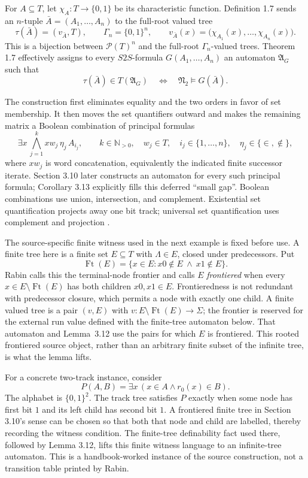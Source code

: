 For \(A\subseteq T\), let \(\chi_A:T\to\{0,1\}\) be its characteristic
function.  Definition 1.7 sends an \(n\)-tuple
\(\bar A=(A_1,\ldots,A_n)\) to the full-root valued tree
\[
 \tau(\bar A)=(v_{\bar A},T),
 \qquad
 \Gamma_n=\{0,1\}^n,
 \qquad
 v_{\bar A}(x)
   =\bigl(\chi_{A_1}(x),\ldots,\chi_{A_n}(x)\bigr).
\]
This is a bijection between \(\mathcal P(T)^n\) and the full-root
\(\Gamma_n\)-valued trees.  Theorem 1.7 effectively assigns to every
\(S2S\)-formula \(G(A_1,\ldots,A_n)\) an automaton
\(\mathfrak A_G\) such that
\[
 \tau(\bar A)\in T(\mathfrak A_G)
 \quad\Longleftrightarrow\quad
 \mathfrak N_2\models G(\bar A).
\]

The construction first eliminates equality and the two orders in favor of set
membership.  It then moves the set quantifiers outward and makes the remaining
matrix a Boolean combination of principal formulas
\[
 \exists x\,
 \bigwedge_{j=1}^{k} xw_j\,\eta_j\,A_{i_j},
 \qquad
 k\in\mathbb N_{>0},
 \quad
 w_j\in T,
 \quad
 i_j\in\{1,\ldots,n\},
 \quad
 \eta_j\in\{\in,\notin\},
\]
where \(xw_j\) is word concatenation, equivalently the indicated finite
successor iterate.  Section 3.10 later constructs an automaton for every such
principal formula; Corollary 3.13 explicitly fills this deferred
\enquote{small gap}.  Boolean combinations use union, intersection, and
complement.  Existential set quantification projects away one bit track;
universal set quantification uses complement and projection
\cite[pp.~7--9, 30--31]{Rabin1969}.

The source-specific finite witness used in the next example is fixed before
use.  A finite tree here is a finite set \(E\subseteq T\) with
\(\Lambda\in E\), closed under predecessors.  Put
\[
 \operatorname{Ft}(E)=\{x\in E:x0\notin E\ \land\ x1\notin E\}.
\]
Rabin calls this the terminal-node frontier and calls \(E\)
\emph{frontiered} when every \(x\in E\setminus\operatorname{Ft}(E)\) has both
children \(x0,x1\in E\).  Frontieredness is not redundant with predecessor
closure, which permits a node with exactly one child.  A finite valued tree is
a pair \((v,E)\) with
\(v:E\setminus\operatorname{Ft}(E)\to\Sigma\); the frontier is reserved for
the external run value defined with the finite-tree automaton below.  That
automaton and Lemma~3.12 use the pairs for which \(E\) is frontiered.  This
rooted frontiered source object, rather than an arbitrary finite subset of the
infinite tree, is what the lemma lifts.

For a concrete two-track instance, consider
\[
 P(A,B)=\exists x\,(x\in A\land r_0(x)\in B).
\]
The alphabet is \(\{0,1\}^2\).  The track tree satisfies \(P\) exactly when
some node has first bit \(1\) and its left child has second bit \(1\).  A
frontiered finite tree in Section 3.10's sense can be chosen so that both that
node and child are labelled, thereby recording the witness condition.  The
finite-tree definability fact used there, followed by Lemma 3.12, lifts this
finite witness language to an infinite-tree automaton.  This is a handbook-worked instance
of the source construction, not a transition table printed by Rabin.

